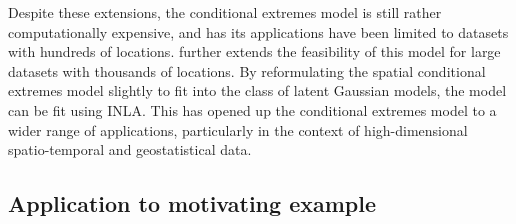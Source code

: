 \documentclass{article}
\numberwithin{equation}{section}
\begin{document}
Despite these extensions, the conditional extremes model is still rather computationally expensive, and has its applications have been limited to datasets with hundreds of locations.
\citet{Simpson2023} further extends the feasibility of this model for large datasets with thousands of locations. 
By reformulating the spatial conditional extremes model slightly to fit into the class of latent Gaussian models, the model can be fit using INLA.
This has opened up the conditional extremes model to a wider range of applications, particularly in the context of high-dimensional spatio-temporal and geostatistical data.

\subsection{Application to motivating example} \label{subsec:ce_example}

\end{document}
